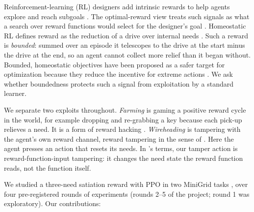 \documentclass[11pt,letterpaper]{article}
\begin{document}
Reinforcement-learning (RL) designers add intrinsic rewards to help agents explore and reach subgoals
\citep{oudeyer2007intrinsic,bellemare2016unifying,pathak2017curiosity,burda2019rnd}. The optimal-reward view treats
such signals as what a search over reward functions would select for the designer's goal
\citep{singh2010intrinsically}. Homeostatic RL defines reward as the reduction of a drive over internal needs
\citep{keramati2014homeostatic}. Such a reward is \emph{bounded}: summed over an episode it telescopes to the drive
at the start minus the drive at the end, so an agent cannot collect more relief than it began without. Bounded,
homeostatic objectives have been proposed as a safer target for optimization because they reduce the incentive for
extreme actions \citep{pihlakas2025homeostasis}. We ask whether boundedness protects such a signal from
exploitation by a standard learner.

We separate two exploits throughout. \emph{Farming} is gaming a positive reward cycle in the world, for example
dropping and re-grabbing a key because each pick-up relieves a need. It is a form of reward hacking
\citep{amodei2016concrete,skalse2022defining}. \emph{Wireheading} is tampering with the agent's own reward channel,
reward tampering in the sense of \citet{everitt2021reward}. Here the agent presses an action that resets its needs.
In \citeauthor{everitt2021reward}'s terms, our tamper action is reward-function-input tampering: it changes the need
state the reward function reads, not the function itself.

We studied a three-need satiation reward with PPO \citep{schulman2017proximal} in two MiniGrid tasks
\citep{chevalier2023minigrid}, over four pre-registered rounds of experiments (rounds 2--5 of the project; round 1
was exploratory). Our contributions:
\end{document}
